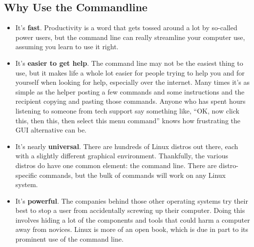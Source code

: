 \documentclass[letterpaper,10pt,english]{sphinxmanual}
\begin{document}
\subsection{Why Use the Commandline}
\label{IntroToCommandLine:why-use-the-commandline}\begin{itemize}
\item {} 
It's \textbf{fast}. Productivity is a word that gets tossed around a lot by so-called power users, but the command line can really streamline your computer use, assuming you learn to use it right.

\item {} 
It's \textbf{easier to get help}. The command line may not be the easiest thing to use, but it makes life a whole lot easier for people trying to help you and for yourself when looking for help, especially over the internet. Many times it's as simple as the helper posting a few commands and some instructions and the recipient copying and pasting those commands. Anyone who has spent hours listening to someone from tech support say something like, “OK, now click this, then this, then select this menu command” knows how frustrating the GUI alternative can be.

\item {} 
It's nearly \textbf{universal}. There are hundreds of Linux distros out there, each with a slightly different graphical environment. Thankfully, the various distros do have one common element: the command line. There are distro-specific commands, but the bulk of commands will work on any Linux system.

\item {} 
It's \textbf{powerful}. The companies behind those other operating systems try their best to stop a user from accidentally screwing up their computer. Doing this involves hiding a lot of the components and tools that could harm a computer away from novices. Linux is more of an open book, which is due in part to its prominent use of the command line.

\end{itemize}
\end{document}
